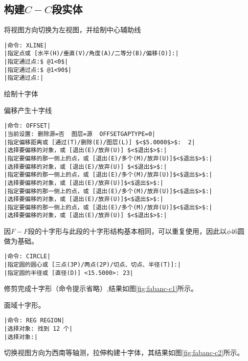 \subsection{构建$C-C$段实体}
\begin{procedure}
\item 将视图方向切换为左视图，并绘制中心辅助线
\begin{lstlisting}
|命令: XLINE|
|指定点或 [水平(H)/垂直(V)/角度(A)/二等分(B)/偏移(O)]:|
|指定通过点:$ @1<0$|
|指定通过点:$ @1<90$|
|指定通过点:|
\end{lstlisting}
\item 绘制十字体

偏移产生十字线
\begin{lstlisting}
|命令: OFFSET|
|当前设置: 删除源=否  图层=源  OFFSETGAPTYPE=0|
|指定偏移距离或 [通过(T)/删除(E)/图层(L)] $<$5.0000$>$:  2|
|选择要偏移的对象，或 [退出(E)/放弃(U)] $<$退出$>$:|
|指定要偏移的那一侧上的点，或 [退出(E)/多个(M)/放弃(U)]$<$退出$>$:|
|选择要偏移的对象，或 [退出(E)/放弃(U)] $<$退出$>$:|
|指定要偏移的那一侧上的点，或 [退出(E)/多个(M)/放弃(U)]$<$退出$>$:|
|选择要偏移的对象，或 [退出(E)/放弃(U)]$<$退出$>$:|
|指定要偏移的那一侧上的点，或 [退出(E)/多个(M)/放弃(U)]$<$退出$>$:|
|选择要偏移的对象，或 [退出(E)/放弃(U)]$<$退出$>$:|
|指定要偏移的那一侧上的点，或 [退出(E)/多个(M)/放弃(U)]$<$退出$>$:|
|选择要偏移的对象，或 [退出(E)/放弃(U)] $<$退出$>$:|
\end{lstlisting}
因$F-F$段的十字形与此段的十字形结构基本相同，可以重复使用，因此以$\phi 46$圆做为基础。
\begin{lstlisting}
|命令: CIRCLE|
|指定圆的圆心或 [三点(3P)/两点(2P)/切点、切点、半径(T)]:|
|指定圆的半径或 [直径(D)] <15.5000>: 23|
\end{lstlisting}
修剪完成十字形（命令提示省略）,结果如图\ref{fig:fabanc-c1}所示。
\begin{figure}[htbp]
\centering
\begin{floatrow}[3]
\end{floatrow}
\end{figure}

\newpage
面域十字形。
\begin{lstlisting}
|命令: REG REGION|
|选择对象: 找到 12 个|
|选择对象:|
\end{lstlisting}
切换视图方向为西南等轴测，拉伸构建十字体，其结果如图\ref{fig:fabanc-c2}所示。


\end{procedure}

